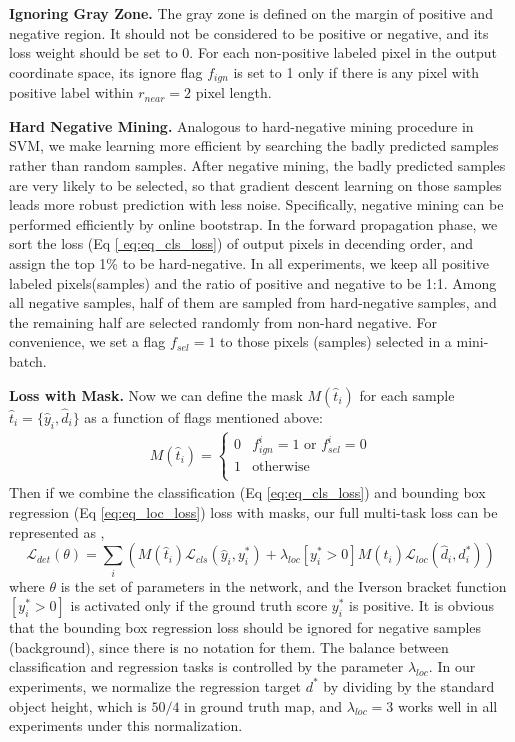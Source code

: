 \textbf{Ignoring Gray Zone.} 
The gray zone is defined on the margin of positive and negative region. It should not be considered to be positive or negative, and its loss weight should be set to $0$.  For each non-positive labeled pixel in the output coordinate space, its ignore flag $f_{ign}$ is set to 1 only if there is any pixel with positive label within $r_{near} = 2$ pixel length.  

\textbf{Hard Negative Mining.} 
Analogous to hard-negative mining procedure in SVM, we make learning more efficient by searching the badly predicted samples rather than random samples. After negative mining, the badly predicted samples are very likely to be selected, so that gradient descent learning on those samples leads more robust prediction with less noise. Specifically, negative mining can be performed efficiently by online bootstrap. In the forward propagation phase, we sort the loss (Eq \ref{ eq:eq_cls_loss}) of output pixels in decending order, and assign the top 1\% to be hard-negative.   In all experiments, we keep all positive labeled pixels(samples) and the ratio of positive and negative to be 1:1.  Among all negative samples, half of them are sampled from hard-negative samples, and the remaining half are selected randomly from non-hard negative. For convenience, we set a flag $f_{sel} = 1$ to those pixels (samples) selected in a mini-batch. 

\textbf{Loss with Mask.} 
Now we can define the mask $M(\hat{t}_i)$ for each sample $\hat{t}_i = \{ \hat{y}_i, \hat{d}_i \}$ as a function of flags mentioned above:
	\begin{eqnarray}\label{eq:eq_mask}
	M(\hat{t}_i) =
	\begin{cases}
	0 &  f_{ign}^{i} = 1 \text{ or } f_{sel}^{i} = 0 \\
	1 & \text{otherwise} \\
	\end{cases}
	\end{eqnarray}
 Then if we combine the classification (Eq \ref{eq:eq_cls_loss})  and bounding box regression (Eq \ref{eq:eq_loc_loss}) loss with masks, our full multi-task loss can be represented as ,
	\begin{equation}\label{eq:eq_det_loss}
	\mathcal{L} _{det}(\theta) =  \sum_{i}  \left ( M(\hat{t}_i) \mathcal{L} _{cls}(\hat{y}_i,y^*_i) + \lambda_{loc} [y^*_i >0]M(\hat{t}_i) \mathcal{L} _{loc}(\hat{d}_i,d^*_i) \right )
	\end{equation}
where $\theta$ is the set of parameters in the network, and the Iverson bracket function $[y^*_i >0]$ is activated only if the ground truth score $y^*_i$ is positive. It is obvious that the bounding box regression loss should be ignored for negative samples (background), since there is no notation for them. The balance between classification and regression tasks is controlled by the parameter $\lambda_{loc}$. In our experiments, we normalize the regression target $d^*$ by dividing by the standard object height, which is $50/4$ in ground truth map, and $\lambda_{loc} = 3$ works well in all experiments under this normalization. 

